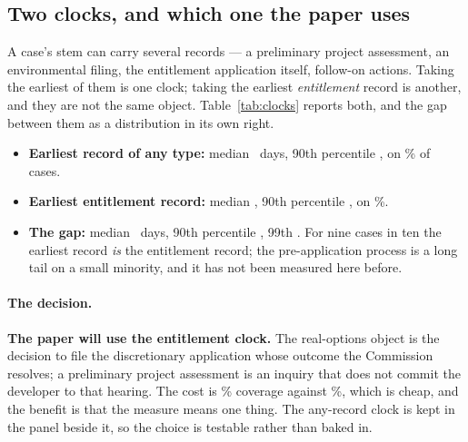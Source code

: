 \documentclass[11pt]{article}
\begin{document}
\subsection{Two clocks, and which one the paper uses}
\label{sec:clocks}

A case's stem can carry several records --- a preliminary project assessment, an environmental
filing, the entitlement application itself, follow-on actions. Taking the earliest of them is
one clock; taking the earliest \emph{entitlement} record is another, and they are not the same
object. Table~\ref{tab:clocks} reports both, and the gap between them as a distribution in its
own right.

\begin{itemize}
\item \textbf{Earliest record of any type:} median \acqClockAnyMed\ days, 90th percentile
\acqClockAnyPninety, on \acqClockAnyCov\% of cases.
\item \textbf{Earliest entitlement record:} median \acqClockEntMed, 90th percentile
\acqClockEntPninety, on \acqClockEntCov\%.
\item \textbf{The gap:} median \acqClockGapMed\ days, 90th percentile \acqClockGapPninety,
99th \acqClockGapPninetynine. For nine cases in ten the earliest record \emph{is} the
entitlement record; the pre-application process is a long tail on a small minority, and it has
not been measured here before.
\end{itemize}

\paragraph{The decision.} \textbf{The paper will use the entitlement clock.} The real-options
object is the decision to file the discretionary application whose outcome the Commission
resolves; a preliminary project assessment is an inquiry that does not commit the developer to
that hearing. The cost is \acqClockEntCov\% coverage against \acqClockAnyCov\%, which is
cheap, and the benefit is that the measure means one thing. The any-record clock is kept in
the panel beside it, so the choice is testable rather than baked in.
\end{document}
